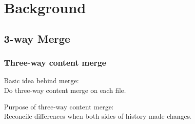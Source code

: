 \documentclass[compress,t]{beamer}
\begin{document}
\section{Background}
\subsection{3-way Merge}

\begin{frame}
  \frametitle{Three-way content merge}

  \begin{center}
  \vfill
  \begin{minipage}{0.6\textwidth}
  \begin{center}
  Basic idea behind merge:\\
  Do three-way content merge on each file.
  \end{center}
  \end{minipage}

  \vfill
  \pause
  \begin{minipage}{0.6\textwidth}
  \begin{center}
  Purpose of three-way content merge:\\
  Reconcile differences when both sides
  of history made changes.
  \end{center}
  \end{minipage}

  \vfill
  \end{center}

\end{frame}

\end{document}
